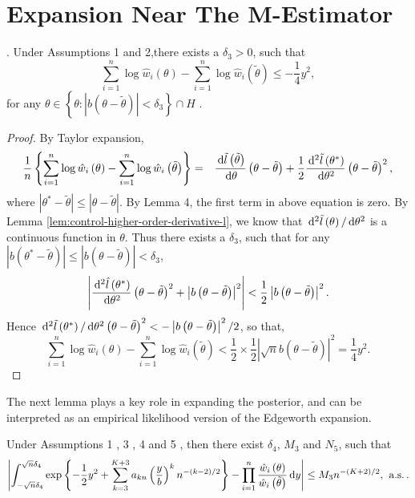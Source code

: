 \section{Expansion Near The M-Estimator}
\begin{lemma}
\label{lem:near-mean-2nd-order-bound-1}.  Under  Assumptions 1 and 2,there exists a $\delta_{3}>0$,
such that 
\[
\sum_{i=1}^{n}\log\hat{w}_{i}\left(\theta\right)-\sum_{i=1}^{n}\log\hat{w}_{i}\left(\tilde{\theta}\right)\le-\frac{1}{4}y^{2},
\]
for any $\theta\in\left\{ \theta:\left|b\left(\theta-\tilde{\theta}\right)\right|<\delta_{3}\right\} \cap H$
. \end{lemma}
\begin{proof}
By Taylor expansion, 
\begin{eqnarray*}
\frac{1}{n}\left\{ \sum_{i=1}^{n}\log\hat{w}_{i}\left(\theta\right)-\sum_{i=1}^{n}\log\hat{w}_{i}\left(\tilde{\theta}\right)\right\}  & = & \frac{\,\mathrm{d}\tilde{l}\left(\tilde{\theta}\right)}{\,\mathrm{d}\theta}\left(\theta-\tilde{\theta}\right)+\frac{1}{2}\frac{\,\mathrm{d}^{2}\tilde{l}\left(\theta^{*}\right)}{\,\mathrm{d}\theta^{2}}\left(\theta-\tilde{\theta}\right)^{2},
\end{eqnarray*}
where $\left|\theta^{*}-\tilde{\theta}\right|\le\left|\theta-\tilde{\theta}\right|$.
By Lemma 4, the first term in above equation
is zero. By Lemma \ref{lem:control-higher-order-derivative-l}, we
know that $\,\mathrm{d}^{2}\tilde{l}\left(\theta\right)/\,\mathrm{d}\theta^{2}$
is a continuous function in $\theta$. Thus there exists a $\delta_{3}$,
such that for any $\left|b\left(\theta^{*}-\tilde{\theta}\right)\right|\le\left|b\left(\theta-\tilde{\theta}\right)\right|<\delta_{3}$,
\[
\left|\frac{\,\mathrm{d}^{2}\hat{l}\left(\theta^{*}\right)}{\,\mathrm{d}\theta^{2}}\left(\theta-\tilde{\theta}\right)^{2}+\left|b\left(\theta-\tilde{\theta}\right)\right|^{2}\right|<\frac{1}{2}\left|b\left(\theta-\tilde{\theta}\right)\right|^{2}.
\]
Hence $\,\mathrm{d}^{2}\tilde{l}\left(\theta^{*}\right)/\,\mathrm{d}\theta^{2}\left(\theta-\tilde{\theta}\right)^{2}<-\left|b\left(\theta-\tilde{\theta}\right)\right|^{2}/2$,
 so that, 
\[
\sum_{i=1}^{n}\log\hat{w}_{i}\left(\theta\right)-\sum_{i=1}^{n}\log\hat{w}_{i}\left(\tilde{\theta}\right)<\frac{1}{2}\times\frac{1}{2}\left|\sqrt{n}b\left(\theta-\tilde{\theta}\right)\right|^{2}=\frac{1}{4}y^{2}.
\]
\end{proof}
The next lemma plays a key role in expanding the posterior, and can be interpreted as an empirical likelihood version of the Edgeworth expansion. 
\begin{lemma}
\label{lem:central-expansion-lik} Under  Assumptions 1 , 3 , 4 and 5 , then there exist $\delta_{4}$, $M_{3}$
and $N_{5}$, such that 
\[
\left|\int_{-\sqrt{n}\delta_{4}}^{\sqrt{n}\delta_{4}}\exp\left\{ -\frac{1}{2}y^{2}+\sum_{k=3}^{K+3}a_{kn}\left(\frac{y}{b}\right)^{k}n^{-\left(k-2\right)/2}\right\} -\prod_{i=1}^{n}\frac{\hat{w}_{i}\left(\theta\right)}{\hat{w}_{i}\left(\tilde{\theta}\right)}\,\mathrm{d} y\right|\le M_{3}n^{-\left(K+2\right)/2},\:\,\mathrm{a.s.}\,.
\]
\end{lemma}
